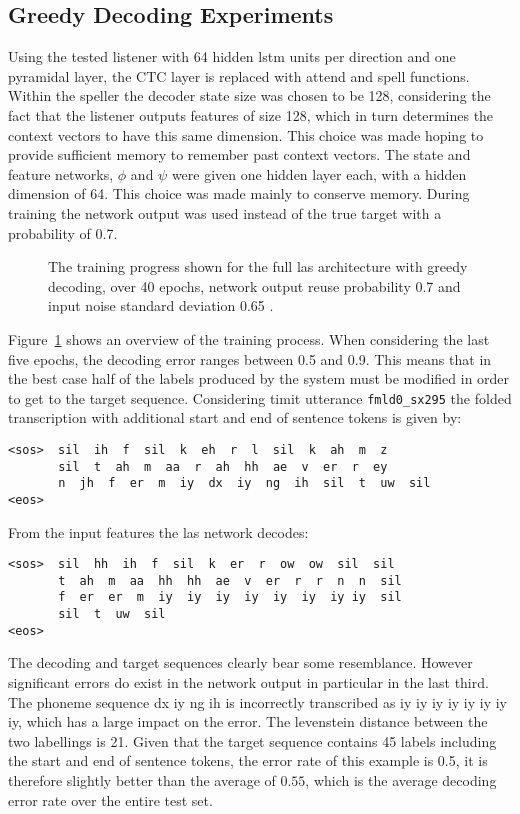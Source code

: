\subsection{Greedy Decoding Experiments}
\label{sec:greedy}
Using the tested listener with 64 hidden lstm units per direction and one pyramidal layer, the CTC layer is replaced with attend and spell functions. Within the speller the decoder state size was chosen to be 128, considering the fact that the listener outputs features of size 128, which in turn determines the context vectors to have this same dimension. This choice was made hoping to provide sufficient memory to remember past context vectors.
The state and feature networks, $\phi$ and $\psi$ were given one hidden layer each, with a hidden dimension of 64. This choice was made mainly to conserve memory. During training the network output was used instead of the true target with a probability of 0.7.
\begin{figure}


\caption{The training progress shown for the full las architecture with greedy decoding, over 40 epochs, network output reuse probability 0.7 and input noise standard deviation 0.65 .}
\label{fig:lasGreedy}
\end{figure}
Figure~\ref{fig:lasGreedy} shows an overview of the training process. When considering the last five epochs, the decoding error  ranges between 0.5 and 0.9. This means that in the best case half of the labels produced by the system must be modified in order to
get to the target sequence. Considering timit utterance \texttt{fmld0\_sx295} the folded transcription with additional start and end of sentence tokens is given by:
\begin{lstlisting}[caption={Targets}]
<sos>  sil  ih  f  sil  k  eh  r  l  sil  k  ah  m  z
       sil  t  ah  m  aa  r  ah  hh  ae  v  er  r  ey
       n  jh  f  er  m  iy  dx  iy  ng  ih  sil  t  uw  sil
<eos>
\end{lstlisting}
From the input features the las network decodes:
\begin{lstlisting}[caption={Network output}]
<sos>  sil  hh  ih  f  sil  k  er  r  ow  ow  sil  sil
       t  ah  m  aa  hh  hh  ae  v  er  r  r  n  n  sil
       f  er  er  m  iy  iy  iy  iy  iy  iy  iy iy  sil
       sil  t  uw  sil
<eos>
\end{lstlisting}
The decoding and target sequences clearly bear some resemblance. However significant errors do exist in the network output in particular in the last third. The phoneme sequence dx  iy  ng  ih is incorrectly transcribed as iy  iy  iy  iy  iy  iy  iy iy,
which has a large impact on the error. The levenstein distance between the two labellings is 21. Given that the target sequence contains 45 labels including the start and end of sentence tokens, the error rate of this example is 0.5, it is therefore slightly better than the average of $0.55$, which is the average decoding error rate over the entire test set.

